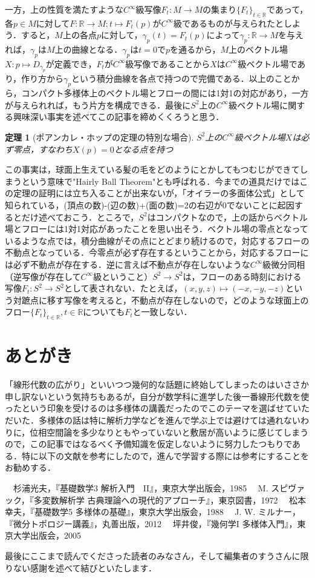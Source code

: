 \documentclass{jsarticle}
\def\realnum{{\mathbb R}}
\newtheorem{theo}{定理}
\begin{document}
一方，上の性質を満たすような$C^\infty$級写像$F_t:M\rightarrow M$の集まり$\{F_t\}_{t\in\realnum}$であって，各$p\in M$に対して$F:\realnum\rightarrow M;t\mapsto F_t(p)$が$C^\infty$級であるものが与えられたとしよう．すると，$M$上の各点$p$に対して，$\gamma_p(t)=F_t(p)$によって$\gamma_p:\realnum\rightarrow M$を与えれば，$\gamma_p$は$M$上の曲線となる．$\gamma_p$は$t=0$で$p$を通るから，$M$上のベクトル場$X:p\mapsto D_{\gamma_p}$が定義でき，$F_t$が$C^\infty$級写像であることから$X$は$C^\infty$級ベクトル場であり，作り方から$\gamma_p$という積分曲線を各点で持つので完備である．以上のことから，コンパクト多様体上のベクトル場とフローの間には1対1の対応があり，一方が与えられれば，もう片方を構成できる．最後に$S^2$上の$C^\infty$級ベクトル場に関する興味深い事実を述べてこの記事を締めくくろうと思う．
\begin{theo}[ポアンカレ・ホップの定理の特別な場合]
$S^2$上の$C^\infty$級ベクトル場$X$は必ず零点，すなわち$X(p)=0$となる点を持つ
\end{theo}
この事実は，球面上生えている髪の毛をどのようにとかしてもつむじができてしまうという意味で"Hairly Ball Theorem"とも呼ばれる．今までの道具だけではこの定理の証明には立ち入ることが出来ないが，「オイラーの多面体公式」として知られている，(頂点の数)-(辺の数)+(面の数)=2の右辺が0でないことに起因するとだけ述べておこう．ところで，$S^2$はコンパクトなので，上の話からベクトル場とフローには1対1対応があったことを思い出そう．ベクトル場の零点となっているような点では，積分曲線がその点にとどまり続けるので，対応するフローの不動点となっている．今零点が必ず存在するということから，対応するフローには必ず不動点が存在する．逆に言えば不動点が存在しないような$C^\infty$級微分同相（逆写像が存在して$C^\infty$級ということ）$S^2\rightarrow S^2$は，フローのある時刻における写像$F_t:S^2\rightarrow S^2$として表されない．たとえば，$(x,y,z)\mapsto (-x,-y,-z)$という対蹠点に移す写像を考えると，不動点が存在しないので，どのような球面上のフロー$\{F_t\}_{t\in\realnum},t\in\realnum$についても$F_t$と一致しない．

\section{あとがき}
「線形代数の広がり」といいつつ幾何的な話題に終始してしまったのはいささか申し訳ないという気持ちもあるが，自分が数学科に進学した後一番線形代数を使ったという印象を受けるのは多様体の講義だったのでこのテーマを選ばせていただいた．多様体の話は特に解析力学などを進んで学ぶ上では避けては通れないわりに，位相空間論を多少なりともやっていないと敷居が高いように感じてしまうので，この記事ではなるべく予備知識を仮定しないように努力したつもりである．特に以下の文献を参考にしたので，進んで学習する際には参考にすることをお勧めする．
\begin{thebibliography}{9}
\bibitem 　杉浦光夫，『基礎数学3 解析入門　II』，東京大学出版会，1985
\bibitem 　M. スピヴァック，『多変数解析学 古典理論への現代的アプローチ』，東京図書，1972
\bibitem 　松本幸夫，『基礎数学5 多様体の基礎』，東京大学出版会，1988
\bibitem 　J. W. ミルナー，『微分トポロジー講義』，丸善出版，2012
\bibitem 　坪井俊，『幾何学I 多様体入門』，東京大学出版会，2005
\end{thebibliography}
最後にここまで読んでくださった読者のみなさん，そして編集者のすうさんに限りない感謝を述べて結びといたします．
\end{document}
